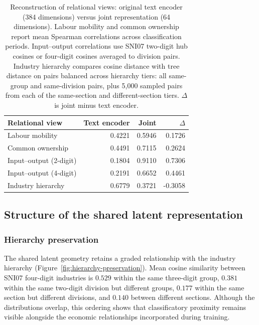 \documentclass[9pt,twocolumn,twoside]{pnas-new}
\begin{document}
\begin{table}[t]
\centering
\begin{tabular}{lrrr}
\toprule
Relational view & Text encoder & Joint & $\Delta$ \\
\midrule
Labour mobility & 0.4221 & 0.5946 & 0.1726 \\
Common ownership & 0.4491 & 0.7115 & 0.2624 \\
Input--output (2-digit) & 0.1804 & 0.9110 & 0.7306 \\
Input--output (4-digit) & 0.2191 & 0.6652 & 0.4461 \\
Industry hierarchy & 0.6779 & 0.3721 & -0.3058 \\
\bottomrule
\end{tabular}
\caption{Reconstruction of relational views: original text encoder (384 dimensions) versus joint representation (64 dimensions). Labour mobility and common ownership report mean Spearman correlations across classification periods. Input--output correlations use SNI07 two-digit hub cosines or four-digit cosines averaged to division pairs. Industry hierarchy compares cosine distance with tree distance on pairs balanced across hierarchy tiers: all same-group and same-division pairs, plus 5,000 sampled pairs from each of the same-section and different-section tiers. $\Delta$ is joint minus text encoder.}
\label{tab:rho-table}
\end{table}


\subsection{Structure of the shared latent representation}
\label{sec:results-emergent}

\subsubsection{Hierarchy preservation}

The shared latent geometry retains a graded relationship with the industry hierarchy (Figure~\ref{fig:hierarchy-preservation}). Mean cosine similarity between SNI07 four-digit industries is $0.529$ within the same three-digit group, $0.381$ within the same two-digit division but different groups, $0.177$ within the same section but different divisions, and $0.140$ between different sections. Although the distributions overlap, this ordering shows that classificatory proximity remains visible alongside the economic relationships incorporated during training.
\end{document}
